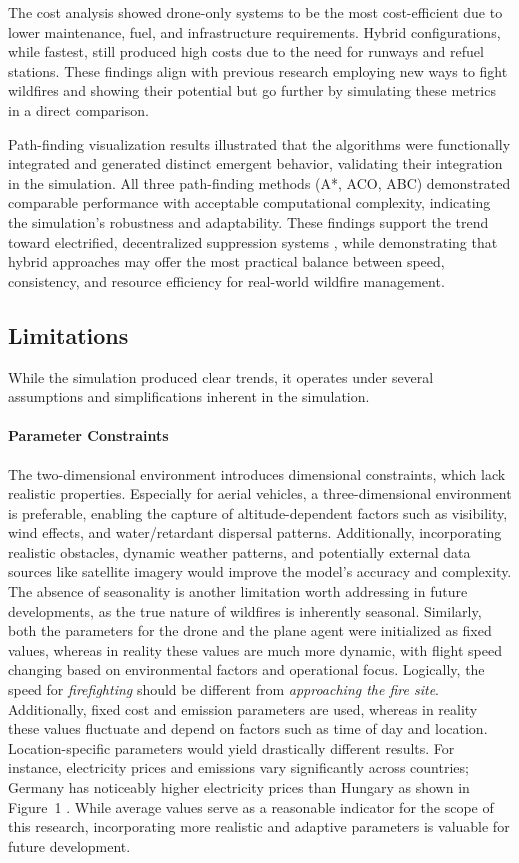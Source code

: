\documentclass[11pt, a4paper]{article}
\begin{document}
The cost analysis showed drone-only systems to be the most cost-efficient due to lower maintenance, fuel, and infrastructure requirements. Hybrid configurations, while fastest, still produced high costs due to the need for runways and refuel stations. These findings align with previous research employing new ways to fight wildfires and showing their potential \citep{fireBalls} but go further by simulating these metrics in a direct comparison.

Path-finding visualization results illustrated that the algorithms were functionally integrated and generated distinct emergent behavior, validating their integration in the simulation.
All three path-finding methods (A*, ACO, ABC) demonstrated comparable performance with acceptable computational complexity, indicating the simulation's robustness and adaptability. These findings support the trend toward electrified, decentralized suppression systems \citep{Saffre2022,stolaroffEnergyUseLife2018}, while demonstrating that hybrid approaches may offer the most practical balance between speed, consistency, and resource efficiency for real-world wildfire management.

\subsection{Limitations}

While the simulation produced clear trends, it operates under several assumptions and simplifications inherent in the simulation.

\paragraph{Parameter Constraints} The two-dimensional environment introduces dimensional constraints, which lack realistic properties. Especially for aerial vehicles, a three-dimensional environment is preferable, enabling the capture of altitude-dependent factors such as visibility, wind effects, and water/retardant dispersal patterns. 
Additionally, incorporating realistic obstacles, dynamic weather patterns, and potentially external data sources like satellite imagery would improve the model's accuracy and complexity. The absence of seasonality is another limitation worth addressing in future developments, as the true nature of wildfires is inherently seasonal.
Similarly, both the parameters for the drone and the plane agent were initialized as fixed values, whereas in reality these values are much more dynamic, with flight speed changing based on environmental factors and operational focus. Logically, the speed for \textit{firefighting} should be different from \textit{approaching the fire site}.
Additionally, fixed cost and emission parameters are used, whereas in reality these values fluctuate and depend on factors such as time of day and location. Location-specific parameters would yield drastically different results. For instance, electricity prices and emissions vary significantly across countries; Germany has noticeably higher electricity prices than Hungary as shown in Figure~1 \citep{ElectricityPriceStatistics}. While average values serve as a reasonable indicator for the scope of this research, incorporating more realistic and adaptive parameters is valuable for future development.
\end{document}
